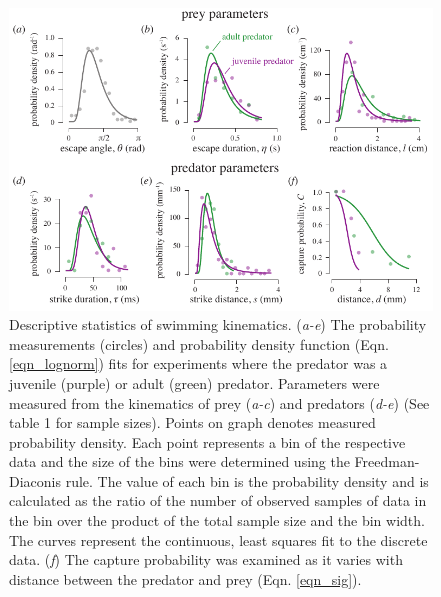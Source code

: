 \documentclass[]{rsos}%
\begin{document}
\begin{figure}[!h]
\centering
	\includegraphics[width=5.5in]{fig_PDFs}
\caption{
Descriptive statistics of swimming kinematics. 
(\textit{a-e}) The probability measurements (circles) and probability density function (Eqn. \ref{eqn_lognorm}) fits for experiments where the predator was a juvenile (purple) or adult (green) predator.
Parameters were measured from the kinematics of prey (\textit{a-c}) and predators (\textit{d-e}) (See table 1 for sample sizes).
Points on graph denotes measured probability density.
Each point represents a bin of the respective data and the size of the bins were determined using the Freedman-Diaconis rule.
The value of each bin is the probability density and is calculated as the ratio of the number of observed samples of data in the bin over the product of the total sample size and the bin width.
The curves represent the continuous, least squares fit to the discrete data.
(\textit{f}) The capture probability was examined as it varies with distance between the predator and prey (Eqn. \ref{eqn_sig}).  
}
\label{fig_PDF}
\end{figure}

\pagebreak
\end{document}
